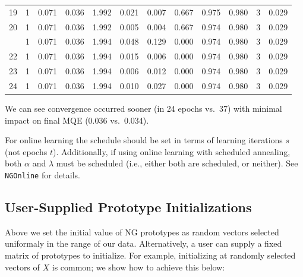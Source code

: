 \documentclass[11pt,]{article}
\begin{document}
\begin{table}[!h]
{\begin{tabular}[t]{rrrrrrrrrrrr}
19 & 1 & 0.071 & 0.036 & 1.992 & 0.021 & 0.007 & 0.667 & 0.975 & 0.980 & 3 & 0.029\\
20 & 1 & 0.071 & 0.036 & 1.992 & 0.005 & 0.004 & 0.667 & 0.974 & 0.980 & 3 & 0.029\\
\addlinespace
21 & 1 & 0.071 & 0.036 & 1.994 & 0.048 & 0.129 & 0.000 & 0.974 & 0.980 & 3 & 0.029\\
22 & 1 & 0.071 & 0.036 & 1.994 & 0.015 & 0.006 & 0.000 & 0.974 & 0.980 & 3 & 0.029\\
23 & 1 & 0.071 & 0.036 & 1.994 & 0.006 & 0.012 & 0.000 & 0.974 & 0.980 & 3 & 0.029\\
24 & 1 & 0.071 & 0.036 & 1.994 & 0.010 & 0.027 & 0.000 & 0.974 & 0.980 & 3 & 0.029\\
\bottomrule
\end{tabular}}
\end{table}

We can see convergence occurred sooner (in 24 epochs vs.~37) with
minimal impact on final MQE (0.036 vs.~0.034).

For online learning the schedule should be set in terms of learning
iterations \(s\) (not epochs \(t\)). Additionally, if using online
learning with scheduled annealing, both \(\alpha\) and \(\lambda\) must
be scheduled (i.e., either both are scheduled, or neither). See
\texttt{NGOnline} for details.

\hypertarget{user-supplied-prototype-initializations}{%
\subsection{User-Supplied Prototype
Initializations}\label{user-supplied-prototype-initializations}}

Above we set the initial value of NG prototypes as random vectors
selected uniformaly in the range of our data. Alternatively, a user can
supply a fixed matrix of prototypes to initialize. For example,
initializing at randomly selected vectors of \(X\) is common; we show
how to achieve this below:
\end{document}
